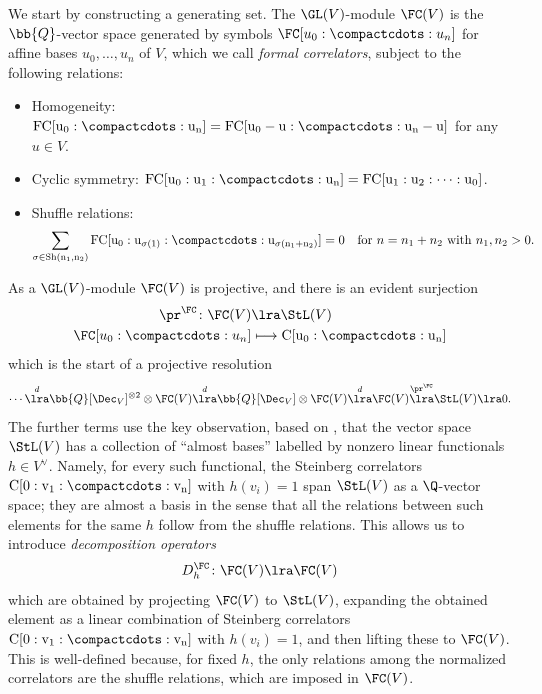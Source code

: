 \documentclass[a4paper]{amsart}
\begin{document}
We start by constructing a generating set. The $\GL(V)$-module $\FC(V)$ is the $\bb{Q}$-vector space generated by symbols $\FC[u_0:\compactcdots:u_n]$ for affine bases $u_0,\ldots, u_n$ of $V$, which we call \emph{formal correlators}, subject to the following relations: 
\begin{itemize}
\item Homogeneity: $\rm{FC}[u_0:\compactcdots:u_n] = \rm{FC}[u_0-u:\compactcdots:u_n-u]$ for any $u \in V$.
\item Cyclic symmetry: $\rm{FC}[u_0:u_1:\compactcdots:u_n] = \rm{FC}[u_1:u_2:\cdots:u_0]$.
\item Shuffle relations: 
\[\sum_{\sigma \in \rm{Sh}(n_1,n_2)} \rm{FC}[u_0:u_{\sigma(1)}:\compactcdots:u_{\sigma(n_1+n_2)}] =0 \quad \text{for $n=n_1+n_2$ with $n_1,n_2>0$.}\]
\end{itemize}
As a $\GL(V)$-module $\FC(V)$ is projective, and there is an evident surjection
\begin{align*}
\pr^\FC \colon \FC(V)&\lra \StL(V)\\
\FC[u_0:\compactcdots:u_n] &\longmapsto \rm{C}[u_0:\compactcdots:u_n]
\end{align*}
which is the start of a projective resolution
\begin{equation}\label{eqn:dec-resolution}\cdots \overset{d}\lra \bb{Q}[\Dec_{V}]^{\otimes 2} \otimes \FC(V) \overset{d}\lra \bb{Q}[\Dec_{V}] \otimes \FC(V) \overset{d}\lra \FC(V) \overset{\pr^\FC}\lra \StL(V)\lra 0.\end{equation}
The further terms use the key observation, based on \cite[Section 3.9]{CharltonRadchenkoRudenko}, that the vector space $\StL(V)$ has a collection of ``almost bases'' labelled by nonzero linear functionals $h\in V^{\vee}$. Namely, for every such functional, the Steinberg correlators $\rm{C}[0:v_1:\compactcdots:v_n]$ with $h(v_i) = 1$ span $\StL(V)$ as a $\Q$-vector space; they are almost a basis in the sense that all the relations between such elements for the same $h$ follow from the shuffle relations. This allows us to introduce \emph{decomposition operators}
\[
D^\FC_{h} \colon \FC(V) \lra \FC(V)
\]
which are obtained by projecting $\FC(V)$ to $\StL(V)$, expanding the obtained element as a linear combination of Steinberg correlators $\rm{C}[0:v_1:\compactcdots:v_n]$ with $h(v_i) = 1$, and then lifting these to $\FC(V)$. This is well-defined because, for fixed $h$, the only relations among the normalized correlators are the shuffle relations, which are imposed in $\FC(V)$.
\end{document}
